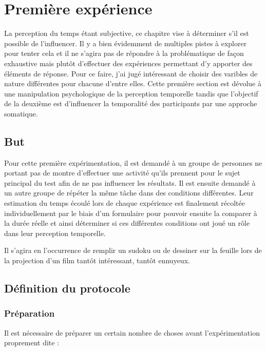 \documentclass[12pt,fleqn,oneside,openany]{book} %
\begin{document}
\section{Première expérience} \label{sec:exp1}
La perception du temps étant subjective, ce chapitre vise à déterminer s'il est possible de l'influencer. Il y a bien évidemment de multiples pistes à explorer pour tenter cela et il ne s'agira pas de répondre à la problématique de façon exhaustive mais plutôt d'effectuer des expériences permettant d'y apporter des éléments de réponse. Pour ce faire, j'ai jugé intéressant de choisir des varibles de nature différentes pour chacune d'entre elles. Cette première section est dévolue à une manipulation psychologique de la perception temporelle tandis que l'objectif de la deuxième est d'influencer la temporalité des participants par une approche somatique.

\subsection{But} \label{ssec:but1}
Pour cette première expérimentation, il est demandé à un groupe de personnes ne portant pas de montre d'effectuer une activité qu'ils prennent pour le sujet principal du test afin de ne pas influencer les résultats. Il est ensuite demandé à un autre groupe de répéter la même tâche dans des conditions différentes. Leur estimation du temps écoulé lors de chaque expérience est finalement récoltée individuellement par le biais d'un formulaire pour pouvoir ensuite la comparer à la durée réelle et ainsi déterminer si ces différentes conditions ont joué un rôle dans leur perception temporelle.

Il s'agira en l'occurrence de remplir un sudoku ou de dessiner sur la feuille lors de la projection d'un film tantôt intéressant, tantôt ennuyeux. 


\subsection{Définition du protocole} \label{ssec:defProto1}

\subsubsection{Préparation} \label{sssec:preparation1}
Il est nécessaire de préparer un certain nombre de choses avant l'expérimentation proprement dite :
\end{document}
